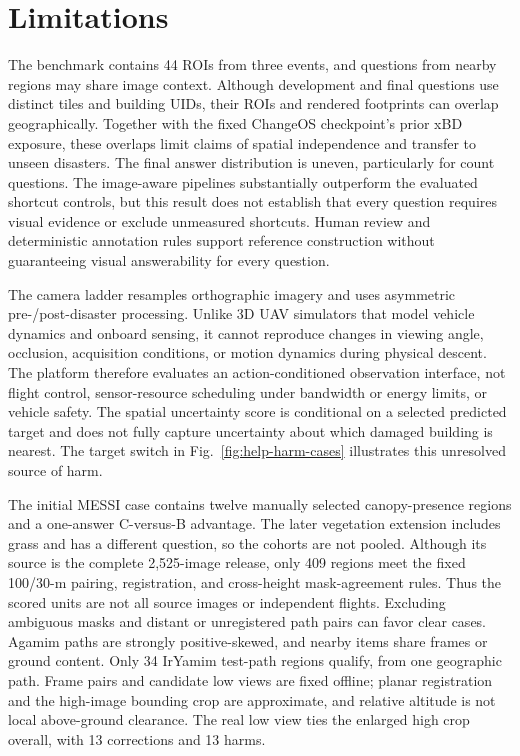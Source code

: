 \section{Limitations}
\label{sec:limitations}
The benchmark contains 44 ROIs from three events, and questions from nearby regions may share image context. Although development and final questions use distinct tiles and building UIDs, their ROIs and rendered footprints can overlap geographically. Together with the fixed ChangeOS checkpoint's prior xBD exposure, these overlaps limit claims of spatial independence and transfer to unseen disasters. The final answer distribution is uneven, particularly for count questions. The image-aware pipelines substantially outperform the evaluated shortcut controls, but this result does not establish that every question requires visual evidence or exclude unmeasured shortcuts. Human review and deterministic annotation rules support reference construction without guaranteeing visual answerability for every question.

The camera ladder resamples orthographic imagery and uses asymmetric pre-/post-disaster processing. Unlike 3D UAV simulators that model vehicle dynamics and onboard sensing, it cannot reproduce changes in viewing angle, occlusion, acquisition conditions, or motion dynamics during physical descent. The platform therefore evaluates an action-conditioned observation interface, not flight control, sensor-resource scheduling under bandwidth or energy limits, or vehicle safety. The spatial uncertainty score is conditional on a selected predicted target and does not fully capture uncertainty about which damaged building is nearest. The target switch in Fig.~\ref{fig:help-harm-cases} illustrates this unresolved source of harm.

The initial MESSI case contains twelve manually selected canopy-presence regions and a one-answer C-versus-B advantage. The later vegetation extension includes grass and has a different question, so the cohorts are not pooled. Although its source is the complete 2,525-image release, only 409 regions meet the fixed 100/30-m pairing, registration, and cross-height mask-agreement rules. Thus the scored units are not all source images or independent flights. Excluding ambiguous masks and distant or unregistered path pairs can favor clear cases. Agamim paths are strongly positive-skewed, and nearby items share frames or ground content. Only 34 IrYamim test-path regions qualify, from one geographic path. Frame pairs and candidate low views are fixed offline; planar registration and the high-image bounding crop are approximate, and relative altitude is not local above-ground clearance. The real low view ties the enlarged high crop overall, with 13 corrections and 13 harms.

